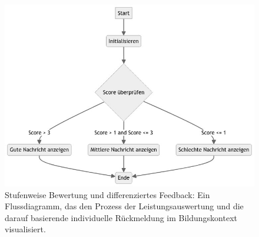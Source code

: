 \documentclass[10pt, fleqn]{scrartcl}
\begin{document}
\begin{figure}[h!]
	\centering
	\includegraphics[scale=0.4]{flowcharts/flowchart3.png}
	\caption{Stufenweise Bewertung und differenziertes Feedback: Ein Flussdiagramm, das den Prozess der Leistungsauswertung und die darauf basierende individuelle Rückmeldung im Bildungskontext visualisiert.}
	\label{fig:presenting-results}
\end{figure}
\end{document}
